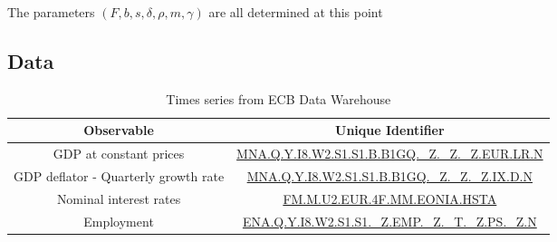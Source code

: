 The parameters $\left( F, b, s, \delta, \rho, m, \gamma \right)$ are all determined at this point

\subsection{Data}

\begin{table}[h]
\begin{tabular}{|c|c|}
\hline
Observable & Unique Identifier\\
\hline
GDP at constant prices & \href{https://sdw.ecb.europa.eu/browseTable.do?node=qview&SERIES_KEY=320.MNA.Q.Y.I8.W2.S1.S1.B.B1GQ._Z._Z._Z.EUR.LR.N&trans=N}{MNA.Q.Y.I8.W2.S1.S1.B.B1GQ.\_Z.\_Z.\_Z.EUR.LR.N}\\
GDP deflator - Quarterly growth rate & \href{https://sdw.ecb.europa.eu/quickview.do?SERIES_KEY=320.MNA.Q.Y.I8.W2.S1.S1.B.B1GQ._Z._Z._Z.IX.D.N}{MNA.Q.Y.I8.W2.S1.S1.B.B1GQ.\_Z.\_Z.\_Z.IX.D.N}\\
Nominal interest rates & \href{https://sdw.ecb.europa.eu/quickview.do?SERIES_KEY=143.FM.M.U2.EUR.4F.MM.EONIA.HSTA&start=&end=&submitOptions.x=0&submitOptions.y=0&trans=QF}{FM.M.U2.EUR.4F.MM.EONIA.HSTA}\\
Employment & \href{https://sdw.ecb.europa.eu/browseChart.do?node=qview&SERIES_KEY=390.ENA.Q.Y.I8.W2.S1.S1._Z.EMP._Z._T._Z.PS._Z.N}{ENA.Q.Y.I8.W2.S1.S1.\_Z.EMP.\_Z.\_T.\_Z.PS.\_Z.N}\\
\hline
\end{tabular}
\caption{Times series from ECB Data Warehouse}
\end{table}